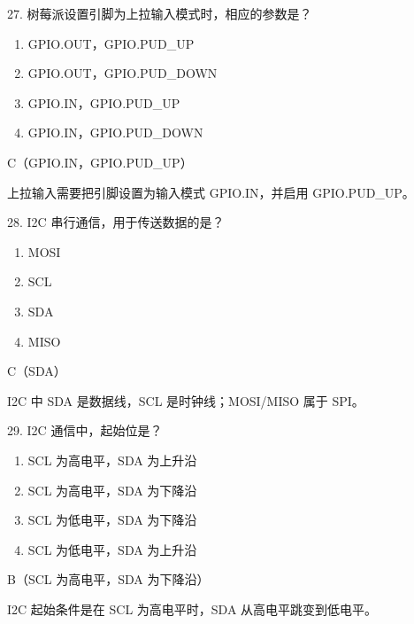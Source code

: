 \begin{question}{27. 树莓派设置引脚为上拉输入模式时，相应的参数是？}
\begin{enumerate}[label=\Alph*., leftmargin=2.4em, itemsep=0.2em]
\item GPIO.OUT，GPIO.PUD\_UP
\item GPIO.OUT，GPIO.PUD\_DOWN
\item GPIO.IN，GPIO.PUD\_UP
\item GPIO.IN，GPIO.PUD\_DOWN
\end{enumerate}
\end{question}
\begin{answer}
C（GPIO.IN，GPIO.PUD\_UP）
\end{answer}
\begin{explanation}
上拉输入需要把引脚设置为输入模式 GPIO.IN，并启用 GPIO.PUD_UP。
\end{explanation}

\begin{question}{28. I2C 串行通信，用于传送数据的是？}
\begin{enumerate}[label=\Alph*., leftmargin=2.4em, itemsep=0.2em]
\item MOSI
\item SCL
\item SDA
\item MISO
\end{enumerate}
\end{question}
\begin{answer}
C（SDA）
\end{answer}
\begin{explanation}
I2C 中 SDA 是数据线，SCL 是时钟线；MOSI/MISO 属于 SPI。
\end{explanation}

\begin{question}{29. I2C 通信中，起始位是？}
\begin{enumerate}[label=\Alph*., leftmargin=2.4em, itemsep=0.2em]
\item SCL 为高电平，SDA 为上升沿
\item SCL 为高电平，SDA 为下降沿
\item SCL 为低电平，SDA 为下降沿
\item SCL 为低电平，SDA 为上升沿
\end{enumerate}
\end{question}
\begin{answer}
B（SCL 为高电平，SDA 为下降沿）
\end{answer}
\begin{explanation}
I2C 起始条件是在 SCL 为高电平时，SDA 从高电平跳变到低电平。
\end{explanation}

